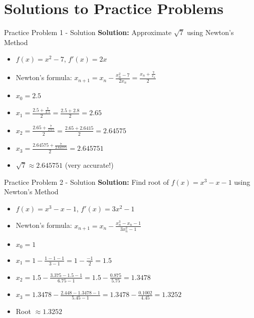 \documentclass[aspectratio=169]{beamer}
\begin{document}
\section{Solutions to Practice Problems}

\begin{frame}{Practice Problem 1 - Solution}
\textbf{Solution:} Approximate $\sqrt{7}$ using Newton's Method

\begin{itemize}
    \item $f(x) = x^2 - 7$, $f'(x) = 2x$
    \item Newton's formula: $x_{n+1} = x_n - \frac{x_n^2 - 7}{2x_n} = \frac{x_n + \frac{7}{x_n}}{2}$
    \item $x_0 = 2.5$
    \item $x_1 = \frac{2.5 + \frac{7}{2.5}}{2} = \frac{2.5 + 2.8}{2} = 2.65$
    \item $x_2 = \frac{2.65 + \frac{7}{2.65}}{2} = \frac{2.65 + 2.6415}{2} = 2.64575$
    \item $x_3 = \frac{2.64575 + \frac{7}{2.64575}}{2} = 2.645751$
    \item $\sqrt{7} \approx 2.645751$ (very accurate!)
\end{itemize}
\end{frame}

\begin{frame}{Practice Problem 2 - Solution}
\textbf{Solution:} Find root of $f(x) = x^3 - x - 1$ using Newton's Method

\begin{itemize}
    \item $f(x) = x^3 - x - 1$, $f'(x) = 3x^2 - 1$
    \item Newton's formula: $x_{n+1} = x_n - \frac{x_n^3 - x_n - 1}{3x_n^2 - 1}$
    \item $x_0 = 1$
    \item $x_1 = 1 - \frac{1 - 1 - 1}{3 - 1} = 1 - \frac{-1}{2} = 1.5$
    \item $x_2 = 1.5 - \frac{3.375 - 1.5 - 1}{6.75 - 1} = 1.5 - \frac{0.875}{5.75} = 1.3478$
    \item $x_3 = 1.3478 - \frac{2.448 - 1.3478 - 1}{5.45 - 1} = 1.3478 - \frac{0.1002}{4.45} = 1.3252$
    \item Root $\approx 1.3252$
\end{itemize}
\end{frame}
\end{document}
